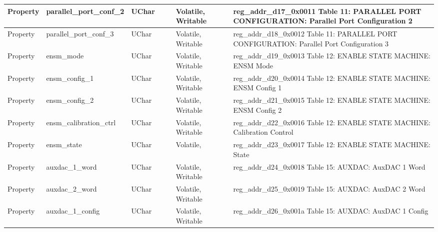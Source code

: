 \documentclass{article}
\begin{document}
\begin{scriptsize}
\begin{longtable}{|p{2cm}|p{5cm}|p{1cm}|p{2cm}|p{2cm}|p{1.75cm}|p{1.5cm}|p{5.1cm}|}
  \hline
  Property & parallel\_port\_conf\_2                                  & UChar &                  &                  & Volatile,  Writable &         & reg\_addr\_d17\_0x0011  Table 11: PARALLEL PORT CONFIGURATION: Parallel Port Configuration 2 \\
  \hline
  Property & parallel\_port\_conf\_3                                  & UChar &                  &                  & Volatile,  Writable &         & reg\_addr\_d18\_0x0012  Table 11: PARALLEL PORT CONFIGURATION: Parallel Port Configuration 3 \\
  \hline
  Property & ensm\_mode                                               & UChar &                  &                  & Volatile,  Writable &         & reg\_addr\_d19\_0x0013  Table 12: ENABLE STATE MACHINE: ENSM Mode \\
  \hline
  Property & ensm\_config\_1                                          & UChar &                  &                  & Volatile,  Writable &         & reg\_addr\_d20\_0x0014  Table 12: ENABLE STATE MACHINE: ENSM Config 1 \\
  \hline
  Property & ensm\_config\_2                                          & UChar &                  &                  & Volatile,  Writable &         & reg\_addr\_d21\_0x0015  Table 12: ENABLE STATE MACHINE: ENSM Config 2 \\
  \hline
  Property & ensm\_calibration\_ctrl                                  & UChar &                  &                  & Volatile,  Writable &         & reg\_addr\_d22\_0x0016  Table 12: ENABLE STATE MACHINE: Calibration Control \\
  \hline
  Property & ensm\_state                                              & UChar &                  &                  & Volatile,           &         & reg\_addr\_d23\_0x0017  Table 12: ENABLE STATE MACHINE: State \\
  \hline
  Property & auxdac\_1\_word                                          & UChar &                  &                  & Volatile,  Writable &         & reg\_addr\_d24\_0x0018  Table 15: AUXDAC: AuxDAC 1 Word \\
  \hline
  Property & auxdac\_2\_word                                          & UChar &                  &                  & Volatile,  Writable &         & reg\_addr\_d25\_0x0019  Table 15: AUXDAC: AuxDAC 2 Word \\
  \hline
  Property & auxdac\_1\_config                                        & UChar &                  &                  & Volatile,  Writable &         & reg\_addr\_d26\_0x001a  Table 15: AUXDAC: AuxDAC 1 Config \\

\end{longtable}
\end{scriptsize}
\end{document}
